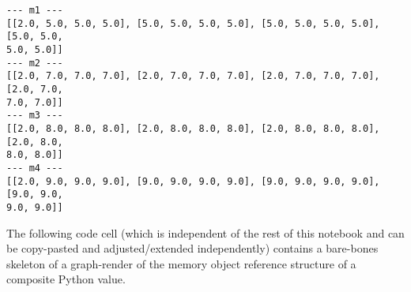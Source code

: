 \documentclass[11pt]{article}
\begin{document}
    \begin{Verbatim}[commandchars=\\\{\}]
--- m1 ---
[[2.0, 5.0, 5.0, 5.0], [5.0, 5.0, 5.0, 5.0], [5.0, 5.0, 5.0, 5.0], [5.0, 5.0,
5.0, 5.0]]
--- m2 ---
[[2.0, 7.0, 7.0, 7.0], [2.0, 7.0, 7.0, 7.0], [2.0, 7.0, 7.0, 7.0], [2.0, 7.0,
7.0, 7.0]]
--- m3 ---
[[2.0, 8.0, 8.0, 8.0], [2.0, 8.0, 8.0, 8.0], [2.0, 8.0, 8.0, 8.0], [2.0, 8.0,
8.0, 8.0]]
--- m4 ---
[[2.0, 9.0, 9.0, 9.0], [9.0, 9.0, 9.0, 9.0], [9.0, 9.0, 9.0, 9.0], [9.0, 9.0,
9.0, 9.0]]
    \end{Verbatim}

    The following code cell (which is independent of the rest of this
notebook and can be copy-pasted and adjusted/extended independently)
contains a bare-bones skeleton of a graph-render of the memory object
reference structure of a composite Python value.
\end{document}
